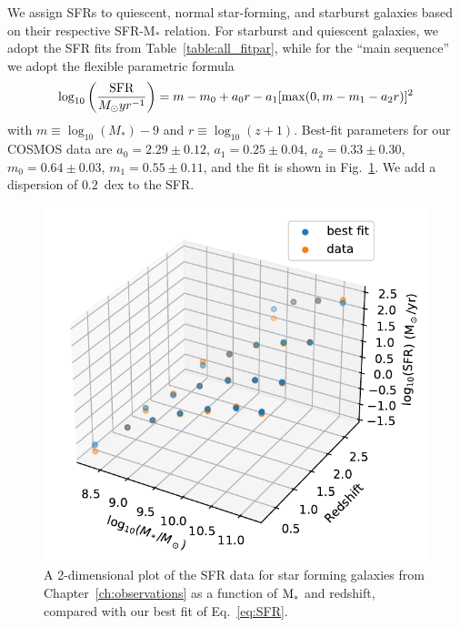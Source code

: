 We assign SFRs to quiescent, normal star-forming, and starburst galaxies based on their respective SFR-M$_*$ relation.
For starburst and quiescent galaxies, we adopt the SFR fits from Table~\ref{table:all_fitpar},
while for the ``main sequence'' we adopt the 
\citet[Eq.~9]{2015A&A...575A..74S} flexible parametric formula
\begin{equation}
    \log_{10}\left(\frac{\rm SFR}{M_\odot yr^{-1}}\right)= m - m_0 +a_0 r - a_1[\max(0,m-m_1-a_2r)]^2
	\label{eq:SFR}
\end{equation}
with $m\equiv\log_{10}(M_*)-9$ and $r\equiv\log_{10}(z+1)$. Best-fit parameters for our COSMOS data are $a_0=2.29\pm 0.12$, $a_1=0.25 \pm 0.04$, $a_2=0.33 \pm 0.30$, $m_0=0.64 \pm 0.03$, $m_1=0.55\pm 0.11$, and the fit is shown in Fig.~\ref{fig:SFR_2D_fit}. We add a dispersion of $0.2$~dex to the SFR. 
\begin{figure}
\begin{center}
  \includegraphics[width=0.65\linewidth]{Figs/Chapter3/2D_SFR_fit_data.pdf}
  \caption{A 2-dimensional plot of the SFR data for star forming galaxies from Chapter~\ref{ch:observations} as a function of ${\rm M}_*$ and redshift, compared with our best fit of Eq.~\ref{eq:SFR}.
  }
    \label{fig:SFR_2D_fit}
\end{center}
\end{figure}

